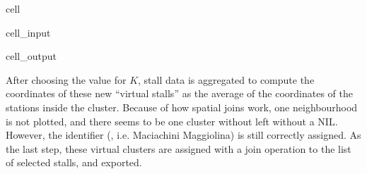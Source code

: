 \documentclass[letterpaper,10pt,english]{jupyterBook}
\begin{document}
\begin{sphinxuseclass}{cell}
\begin{sphinxuseclass}{cell_input}
\begin{sphinxVerbatim}[commandchars=\\\{\}]
    

   
         \PYG{p}{[}\PYG{p}{]}

   

\end{sphinxVerbatim}

\end{sphinxuseclass}
\begin{sphinxuseclass}{cell_output}
\noindent{}

\end{sphinxuseclass}
\end{sphinxuseclass}
\sphinxAtStartPar
After choosing the value for \(K\), stall data is aggregated to compute the coordinates of these new “virtual stalls” as the average of the coordinates of the stations inside the cluster. Because of how spatial joins work, one neighbourhood is not plotted, and there seems to be one cluster without left without a NIL. However, the identifier (, i.e. Maciachini \sphinxhyphen{} Maggiolina) is still correctly assigned. As the last step, these virtual clusters are assigned with a join operation to the list of selected stalls, and exported.
\end{document}
